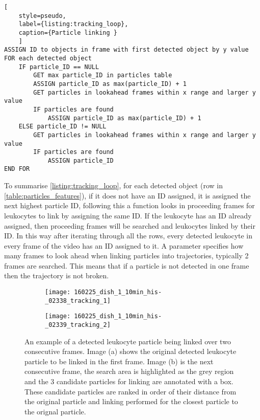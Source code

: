 \begin{lstlisting}[
	style=pseudo,
	label={listing:tracking_loop},
	caption={Particle linking }
	]
ASSIGN ID to objects in frame with first detected object by y value
FOR each detected object
	IF particle_ID == NULL
		GET max particle_ID in particles table
		ASSIGN particle_ID as max(particle_ID) + 1
		GET particles in lookahead frames within x range and larger y value
		IF particles are found
			ASSIGN particle_ID as max(particle_ID) + 1
	ELSE particle_ID != NULL
		GET particles in lookahead frames within x range and larger y value
		IF particles are found
			ASSIGN particle_ID
END FOR
\end{lstlisting}

To summarise \autoref{listing:tracking_loop}, for each detected object (row in \autoref{table:particles_features}), if it does not have an ID assigned, it is assigned the next highest particle ID, following this a function looks in proceeding frames for leukocytes to link by assigning the same ID. If the leukocyte has an ID already assigned, then proceeding frames will be searched and leukocytes linked by their ID. In this way after iterating through all the rows, every detected leukocyte in every frame of the video has an ID assigned to it. A parameter specifies how many frames to look ahead when linking particles into trajectories, typically 2 frames are searched. This means that if a particle is not detected in one frame then the trajectory is not broken.

\begin{figure}[htbp]{}
	\centering
	\begin{subfigure}[b]{0.49\linewidth}
		\texttt{[image: 160225\_dish\_1\_10min\_his-\_02338\_tracking\_1]}
		\caption{}
		\label{figure:video_processing:particle_linking_1}
	\end{subfigure}
	\begin{subfigure}[b]{0.49\linewidth}
		\texttt{[image: 160225\_dish\_1\_10min\_his-\_02339\_tracking\_2]}
		\caption{}
		\label{figure:video_processing:particle_linking_2}
	\end{subfigure}
\caption[Leukocyte particle linking]{An example of a detected leukocyte particle being linked over two consecutive frames. Image (a) shows the original detected leukocyte particle to be linked in the first frame. Image (b) is the next consecutive frame, the search area is highlighted as the grey region and the 3 candidate particles for linking are annotated with a box. These candidate particles are ranked in order of their distance from the original particle and linking performed for the closest particle to the orignal particle.}
\label{figure:video_processing:particle_linking}
\end{figure}

